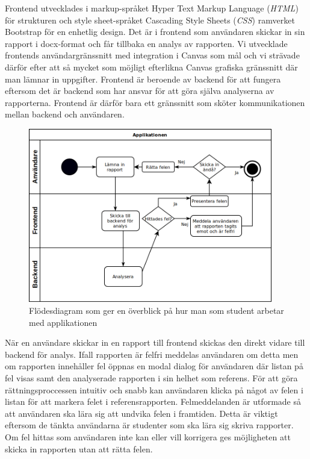 \documentclass[swedish]{maucsthesis}
\begin{document}
Frontend utvecklades i markup-språket Hyper Text Markup Language (\textit{HTML}) för
strukturen och style sheet-språket Cascading Style Sheets (\textit{CSS}) ramverket
Bootstrap för en enhetlig design. Det är i frontend som användaren skickar in
sin rapport i docx-format och får tillbaka en analys av rapporten. Vi utvecklade
frontends användargränssnitt med integration i Canvas som mål och vi strävade
därför efter att så mycket som möjligt efterlikna Canvas grafiska gränssnitt
där man lämnar in uppgifter. Frontend är beroende av backend för att fungera
eftersom det är backend som har ansvar för att göra själva analyserna av
rapporterna. Frontend är därför bara ett gränssnitt som sköter kommunikationen
mellan backend och användaren.

\begin{figure}[H]
    \centering
    \includegraphics[width=0.95\textwidth]{overviewflow.png}
    \caption{Flödesdiagram som ger en överblick på hur man som student arbetar
      med applikationen}
    \label{fig:overviewflow}
\end{figure}

När en användare skickar in en rapport till frontend skickas den direkt vidare
till backend för analys. Ifall rapporten är felfri meddelas användaren om detta
men om rapporten innehåller fel öppnas en modal dialog för användaren där listan
på fel visas samt den analyserade rapporten i sin helhet som referens. För att
göra rättningsproccessen intuitiv och snabb kan användaren klicka på något av
felen i listan för att markera felet i referensrapporten. Felmeddelanden är
utformade så att användaren ska lära sig att undvika felen i framtiden. Detta är
viktigt eftersom de tänkta användarna är studenter som ska lära sig skriva
rapporter. Om fel hittas som användaren inte
kan eller vill korrigera ges möjligheten att skicka in rapporten utan att rätta
felen.
\end{document}
